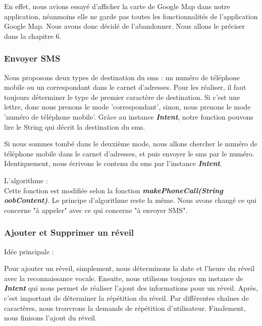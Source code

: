 \indent En effet, nous avions essayé d'afficher la carte de Google Map dans notre application, néanmoins elle ne garde pas toutes les fonctionnalités de l'application Google Map. Nous avons donc décidé de l'abandonner. Nous allons le préciser dans la chapitre 6.

\subsubsection{Envoyer SMS}

\indent Nous proposons deux types de destination du sms : un numéro de téléphone mobile ou un correspondant dans le carnet d'adresses.  Pour les réaliser, il faut toujours déterminer le type de premier caractère de destination. Si c'est une lettre, donc nous prenons le mode 'correspondant', sinon, nous prenons le mode 'numéro de téléphone mobile'. Grâce au instance \textbf{\emph{Intent}}, notre fonction pouvons lire le String qui décrit la destination du sms. 

\indent Si nous sommes tombé dans le deuxième mode, nous allons chercher le numéro de téléphone mobile dans le carnet d'adresses, et puis envoyer le sms par le numéro.\\

\indent Identiquement, nous écrivons le contenu du sms par l'instance \textbf{\emph{Intent}}.

\indent L'algorithme :\\



	Cette fonction est modifiée selon la fonction \textbf{\emph{makePhoneCall(String oobContent)}}. Le principe d'algorithme reste la même. Nous avons changé ce qui concerne "à appeler" avec ce qui concerne "à envoyer SMS".
	
\subsubsection{Ajouter et Supprimer un réveil}

\indent Idée principale :

\indent Pour ajouter un réveil, simplement, nous déterminons la date et l'heure du réveil avec la reconnaissance vocale. Ensuite, nous utilisons toujours un instance de \textbf{\emph{Intent}} qui nous permet de réaliser l'ajout des informations pour un réveil. Après, c'est important de déterminer la répétition du réveil. Par différentes chaînes de caractères, nous trouvrons la demande de répétition d'utilisateur. Finalement, nous finisons l'ajout du réveil.

